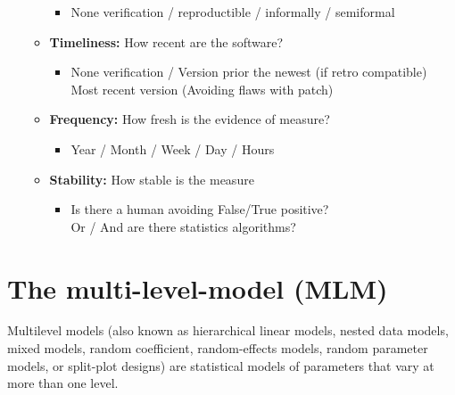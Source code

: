 \documentclass[12pt]{report}
\begin{document}
\begin{itemize}
\begin{itemize}
\begin{itemize}
	\item	None verification / reproductible / informally / semiformal \par


\end{itemize}
	\item \textbf{ Timeliness:  }How recent are the software? \par

\begin{itemize}
	\item None verification / Version prior the newest (if retro compatible)  \\
Most recent version (Avoiding flaws with patch)  \par


\end{itemize}
	\item \textbf{Frequency: } How fresh is the evidence of measure? \par

\begin{itemize}
	\item \textbf{ }Year / Month / Week / Day / Hours\par


\end{itemize}
	\item \textbf{Stability:  }How stable is the measure \par

\begin{itemize}
	\item Is there a human avoiding False/True positive? \\ Or / And are there statistics algorithms? \par


\end{itemize}
\end{itemize}
\end{itemize}

\newpage

\section*{The multi-level-model (MLM) }
Multilevel models (also known as hierarchical linear models, nested data models, mixed models, random coefficient, random-effects models, random parameter models, or split-plot designs) are statistical models of parameters that vary at more than one level.  \par
\end{document}
